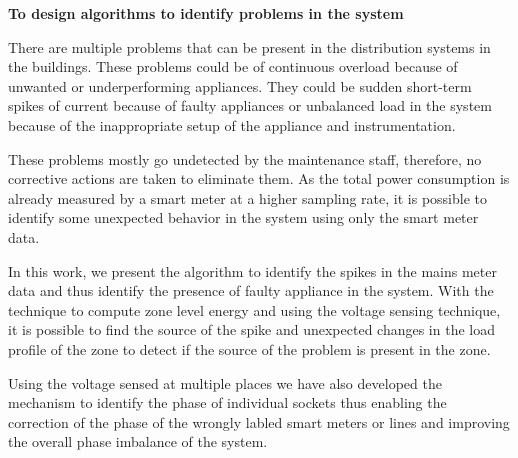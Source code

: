 \textbf{To design algorithms to identify problems in the system}

There are multiple problems that can be present in the distribution systems in the buildings. These problems could be of continuous overload because of unwanted or underperforming appliances. They could be sudden short-term spikes of current because of faulty appliances or unbalanced load in the system because of the inappropriate setup of the appliance and instrumentation.  

These problems mostly go undetected by the maintenance staff, therefore, no corrective actions are taken to eliminate them. As the total power consumption is already measured by a smart meter at a higher sampling rate, it is possible to identify some unexpected behavior in the system using only the smart meter data. 

In this work, we present the algorithm to identify the spikes in the mains meter data and thus identify the presence of faulty appliance in the system. With the technique to compute zone level energy and using the voltage sensing technique, it is possible to find the source of the spike and unexpected changes in the load profile of the zone to detect if the source of the problem is present in the zone. 

Using the voltage sensed at multiple places we have also developed the mechanism to identify the phase of individual sockets thus enabling the correction of the phase of the wrongly labled smart meters or lines and improving the overall phase imbalance of the system.